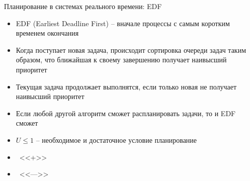 \documentclass[aspectratio=169,14pt]{beamer}
\begin{document}
\begin{frame}{Планирование в системах реального времени: EDF}
    \begin{footnotesize}
    \begin{spacing}{0.8}
    \begin{itemize}
        \item EDF (Earliest Deadline First) – вначале процессы с самым коротким
        временем окончания
        \item Когда поступает новая задача, происходит сортировка очереди
        задач таким образом, что ближайшая к своему завершению получает
        наивысший приоритет
        \item Текущая задача продолжает выполнятся, если только новая не
        получает наивысший приоритет
        \item Если любой другой алгоритм сможет распланировать задачи,
        то и EDF сможет
        \item $U \leq 1$ – необходимое и достаточное условие планирование
        \item ~<<+>>
        \begin{itemize}
            \begin{tiny}
            \end{tiny}
        \end{itemize}
        \item ~<<--->>
        \begin{itemize}
            \begin{tiny}
            \end{tiny}
        \end{itemize}
    \end{itemize}
    \end{spacing}
    \end{footnotesize}
\end{frame}
\end{document}
